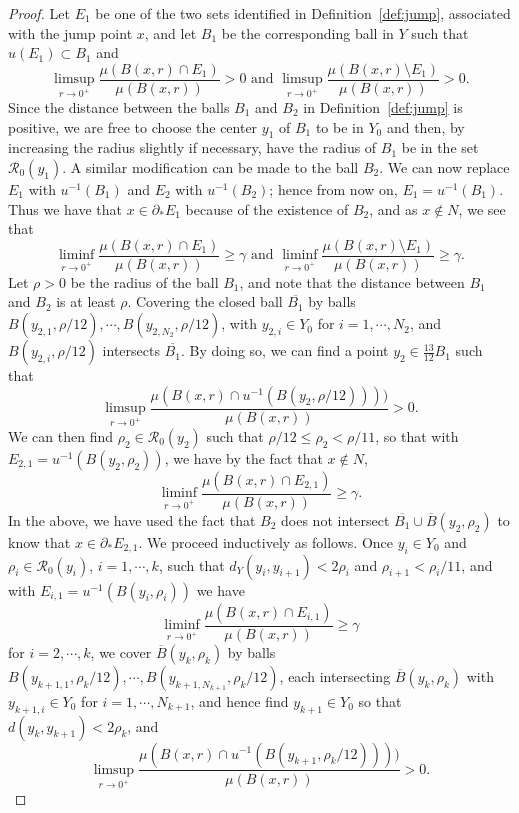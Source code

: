 \documentclass[11pt, letterpaper]{amsart} %
\numberwithin{equation}{section}
\theoremstyle{plain}
\theoremstyle{definition}
\begin{document}
{\begin{proof}
Let $E_1$ be one of the two sets identified in Definition~\ref{def:jump}, associated with the jump point $x$,
and let $B_1$ be the corresponding ball in $Y$ such that $u(E_1)\subset B_1$ and 
\[
\limsup_{r\to 0^+}\frac{\mu(B(x,r)\cap E_1)}{\mu(B(x,r))}>0 \text{ and }
\limsup_{r\to 0^+}\frac{\mu(B(x,r)\setminus E_1)}{\mu(B(x,r))}>0.
\]
Since the distance between the balls $B_1$ and $B_2$ in Definition~\ref{def:jump} is
positive, we are free to choose the center $y_1$ of $B_1$ to be in $Y_0$ and then, by increasing the radius slightly if necessary,
have the radius of $B_1$ be in the set $\mathcal{R}_0(y_1)$. A similar modification can be made to the ball $B_2$.
We can now replace $E_1$ with $u^{-1}(B_1)$ and $E_2$ with $u^{-1}(B_2)$; hence from now on,
$E_1=u^{-1}(B_1)$.
Thus
we have that $x\in\partial_*E_1$ because of the existence of $B_2$, 
and as $x\not\in N$, we see that
\[
\liminf_{r\to 0^+}\frac{\mu(B(x,r)\cap E_1)}{\mu(B(x,r))}\ge \gamma \text{ and }
\liminf_{r\to 0^+}\frac{\mu(B(x,r)\setminus E_1)}{\mu(B(x,r))}\ge \gamma.
\]
Let $\rho>0$ be the radius of the ball $B_1$, and note that the distance between $B_1$ and $B_2$ is at least $\rho$.
Covering the closed ball $\overline{B_1}$ by balls $B(y_{2,1},\rho/12),\cdots, B(y_{2,N_2},\rho/12)$,
with $y_{2,i}\in Y_0$ for $i=1,\cdots, N_2$, and $B(y_{2,i},\rho/12)$ intersects $\overline{B_1}$.
By doing so, we can find a point $y_2\in \tfrac{13}{12}B_1$ such that
\[
\limsup_{r\to 0^+}\frac{\mu(B(x,r)\cap u^{-1}(B(y_2,\rho/12))))}{\mu(B(x,r))}>0.
\]
We can then find $\rho_2\in\mathcal{R}_0(y_2)$ such that $\rho/12\le \rho_2<\rho/11$,
so that with $E_{2,1}=u^{-1}(B(y_2,\rho_2))$, we have by the fact that $x\not\in N$,
\[
\liminf_{r\to 0^+}\frac{\mu(B(x,r)\cap E_{2,1})}{\mu(B(x,r))}\ge \gamma.
\]
In the above, we have used the fact that $B_2$ does not intersect $\overline{B_1}\cup\overline{B}(y_2,\rho_2)$ 
to know that $x\in\partial_*E_{2,1}$. We proceed inductively as follows. Once $y_i\in Y_0$ and 
$\rho_i\in\mathcal{R}_0(y_i)$, $i=1,\cdots, k$, such that $d_Y(y_i, y_{i+1})<2\rho_i$ and
$\rho_{i+1}<\rho_i/11$, and with $E_{i,1}=u^{-1}(B(y_i,\rho_i))$ we have
\[
\liminf_{r\to 0^+}\frac{\mu(B(x,r)\cap E_{i,1})}{\mu(B(x,r))}\ge \gamma
\]
for $i=2,\cdots, k$, we cover $\overline{B}(y_k,\rho_k)$ by balls 
$B(y_{k+1,1},\rho_k/12),\cdots, B(y_{k+1,N_{k+1}},\rho_k/12)$, each intersecting $\overline{B}(y_k,\rho_k)$
with $y_{k+1,i}\in Y_0$ for $i=1,\cdots, N_{k+1}$, and hence find $y_{k+1}\in Y_0$ so that 
$d(y_k,y_{k+1})<2\rho_k$, and 
\[
\limsup_{r\to 0^+}\frac{\mu(B(x,r)\cap u^{-1}(B(y_{k+1},\rho_k/12))))}{\mu(B(x,r))}>0.
\]
\end{proof}}
\end{document}
